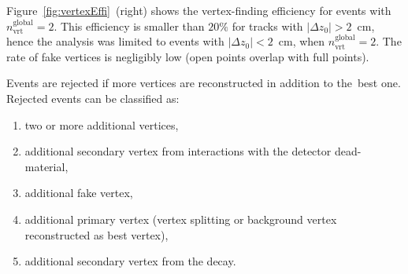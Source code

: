 Figure~\ref{fig:vertexEffi}~(right) shows the vertex-finding efficiency for events with $n^\textrm{global}_\textrm{vrt}=2$. This efficiency is smaller than $20\%$ for tracks with $|\Delta z_0|>2$~cm, hence the analysis was limited to  events with  $|\Delta z_0|<2$~cm, when $n^\textrm{global}_\textrm{vrt}=2$.  The rate of fake vertices is negligibly low (open points overlap with full points).


Events are rejected if more vertices are reconstructed in addition to the~best one. Rejected events can be classified as:

\begin{enumerate}[label=\alph*)]
	\item two or more additional vertices,
	\item additional  secondary vertex from interactions with the detector dead-material,
	\item additional fake  vertex,
	\item additional primary  vertex (vertex splitting or background vertex reconstructed as best vertex),
	\item additional secondary vertex from the decay. 
\end{enumerate}


